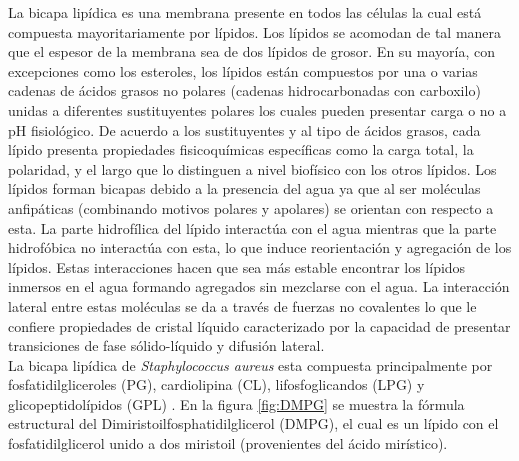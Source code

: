 La bicapa lip\'{i}dica es una membrana presente en todos las c\'{e}lulas la cual est\'{a} compuesta mayoritariamente por l\'{i}pidos. Los l\'{i}pidos se acomodan de tal manera que el espesor de la membrana sea de dos l\'{i}pidos de grosor. En su mayor\'{i}a, con excepciones como los esteroles, los l\'{i}pidos est\'{a}n compuestos por una o varias cadenas de \'{a}cidos grasos no polares (cadenas hidrocarbonadas con carboxilo) unidas a diferentes sustituyentes polares los cuales pueden presentar carga o no a pH fisiol\'{o}gico. De acuerdo a los sustituyentes y al tipo de \'{a}cidos grasos, cada l\'{i}pido presenta propiedades fisicoqu\'{i}micas espec\'{i}ficas como la carga total, la polaridad, y el largo que lo distinguen a nivel biof\'{i}sico con los otros l\'{i}pidos. Los l\'{i}pidos forman bicapas debido a la presencia del agua ya que al ser mol\'{e}culas anfip\'{a}ticas (combinando motivos polares y apolares) se orientan con respecto a esta. La parte hidrof\'{i}lica del l\'{i}pido interact\'{u}a con el agua mientras que la parte hidrof\'{o}bica no interact\'{u}a con esta, lo que induce reorientaci\'{o}n y agregaci\'{o}n de los l\'{i}pidos. Estas interacciones hacen que sea m\'{a}s estable encontrar los l\'{i}pidos inmersos en el agua formando agregados sin mezclarse con el agua. La interacci\'on lateral entre estas mol\'eculas se da a trav\'es de fuerzas no covalentes lo que le confiere propiedades de cristal l\'iquido caracterizado por la capacidad de presentar transiciones de fase s\'olido-l\'iquido y difusi\'{o}n lateral. \\

La bicapa lip\'{i}dica de \textit{Staphylococcus aureus} esta compuesta principalmente por fosfatidilgliceroles (PG), cardiolipina (CL), lifosfoglicandos (LPG) y glicopeptidol\'{i}pidos (GPL) \cite{Sohlenkamp2015BacterialPathways}. En la figura \ref{fig:DMPG} se muestra la f\'{o}rmula estructural del Dimiristoilfosphatidilglicerol (DMPG), el cual es un l\'{i}pido con el fosfatidilglicerol unido a dos miristoil (provenientes del \'{a}cido mir\'{i}stico). 
\\

